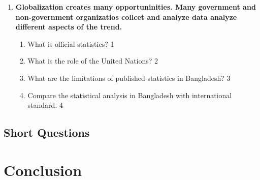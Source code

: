 \documentclass[a4paper,oneside]{book}
\begin{document}
\begin{enumerate}
   \item
	  \textbf{Globalization creates many opportuninities. Many government and non-government organizatios collcet and analyze data analyze different aspects of the trend.} 
  
  \begin{enumerate}
    \item
	What is official statistics?  \hfill 1
    \item
	What is the role of the United Nations? \hfill 2
    \item  
	What are the limitations of published statistics in Bangladesh? \hfill 3
    \item
	Compare the statistical analysis in Bangladesh with international standard. \hfill 4
  \end{enumerate}

  
 \end{enumerate}
\section{Short Questions}

\backmatter
\chapter{Conclusion}
\lipsum[8]

\tableofcontents
\end{document}
